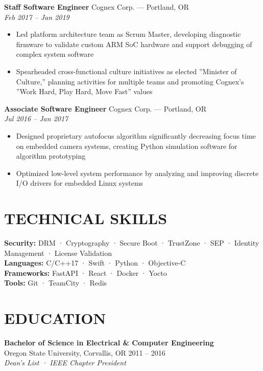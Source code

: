 \documentclass[10pt,letterpaper]{article}
\newcommand{\experienceitem}[4]{
  \textbf{#1} \hfill \textcolor{accentcolor}{#2}\\
  \textit{#3} \hfill \textit{#4}\\[-0.8em]
}
\newcommand{\educationitem}[4]{
  \textbf{#1}\\
  #2 \hfill #3\\
  \textit{#4}
}
\begin{document}
\vspace{4pt}
\experienceitem
  {Staff Software Engineer}
  {Cognex Corp. — Portland, OR}
  {}
  {Feb 2017 – Jan 2019}
\begin{itemize}
  \item Led platform architecture team as Scrum Master, developing diagnostic firmware to validate custom ARM SoC hardware and support debugging of complex system software
  \item Spearheaded cross-functional culture initiatives as elected ''Minister of Culture,'' planning activities for multiple teams and promoting Cognex's ''Work Hard, Play Hard, Move Fast'' values
\end{itemize}

\vspace{4pt}
\experienceitem
  {Associate Software Engineer}
  {Cognex Corp. — Portland, OR}
  {}
  {Jul 2016 – Jan 2017}
\begin{itemize}
  \item Designed proprietary autofocus algorithm significantly decreasing focus time on embedded camera systems, creating Python simulation software for algorithm prototyping
  \item Optimized low-level system performance by analyzing and improving discrete I/O drivers for embedded Linux systems
\end{itemize}

\section{TECHNICAL SKILLS}
\textbf{Security:} DRM · Cryptography · Secure Boot · TrustZone · SEP · Identity Management · License Validation\\
\textbf{Languages:} C/C++17 · Swift · Python · Objective-C\\
\textbf{Frameworks:} FastAPI · React · Docker · Yocto\\
\textbf{Tools:} Git · TeamCity · Redis

\section{EDUCATION}
\educationitem
  {Bachelor of Science in Electrical \& Computer Engineering}
  {Oregon State University, Corvallis, OR}
  {2011 – 2016}
  {Dean's List · IEEE Chapter President}
\end{document}
